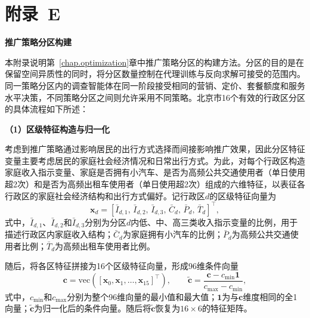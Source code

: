 
\setlength{\baselineskip}{16pt}
\chapter{附录~E}\label{appen.e}

\renewcommand{\thetable}{E-\arabic{table}}
\renewcommand{\thefigure}{E-\arabic{figure}}
\renewcommand{\theequation}{E-\arabic{equation}}
\renewcommand{\theHtable}{E.\arabic{table}}
\renewcommand{\theHfigure}{E.\arabic{figure}}
\renewcommand{\theHequation}{E.\arabic{equation}}
\setcounter{table}{0}
\setcounter{figure}{0}
\setcounter{equation}{0}

\begin{center}
\textbf{推广策略分区构建}
\end{center}

本附录说明第~\ref{chap.optimization}章中推广策略分区的构建方法。分区的目的是在保留空间异质性的同时，将分区数量控制在代理训练与反向求解可接受的范围内。同一策略分区内的调查智能体在同一阶段接受相同的营销、定价、套餐额度和服务水平决策，不同策略分区之间则允许采用不同策略。北京市16个有效的行政区分区的具体流程如下所述：

\textbf{（1）区级特征构造与归一化}

考虑到推广策略通过影响居民的出行方式选择而间接影响推广效果，因此分区特征变量主要考虑居民的家庭社会经济情况和日常出行方式。为此，对每个行政区构造家庭收入指示变量、家庭是否拥有小汽车、是否为高频公共交通使用者（单日使用超2次）和是否为高频出租车使用者（单日使用超2次）组成的六维特征，以表征各行政区的家庭社会经济结构和出行方式偏好。记行政区$d$的区级特征向量为
\begin{equation}
\bm{x}_{d}
=
\left[
\bar I_{d,1},\,
\bar I_{d,2},\,
\bar I_{d,3},\,
\bar C_{d},\,
\bar P_{d},\,
\bar T_{d}
\right]^{\top},
\label{eq.append.zone.feature}
\end{equation}
式中，$\bar I_{d,1}$、$\bar I_{d,2}$和$\bar I_{d,3}$分别为分区$d$内低、中、高三类收入指示变量的比例，用于描述行政区内家庭收入结构；$\bar C_d$为家庭拥有小汽车的比例；$\bar P_d$为高频公共交通使用者比例；$\bar T_d$为高频出租车使用者比例。

随后，将各区特征拼接为16个区级特征向量，形成96维条件向量
\begin{equation}
\bm{c}
=\mathrm{vec}
\left(
[\bm{x}_{0},\bm{x}_{1},\ldots,\bm{x}_{15}]^{\top}
\right),
\qquad
\tilde{\bm{c}}
=
\frac{\bm{c}-c_{\min}\bm{1}}
{c_{\max}-c_{\min}},
\label{eq.append.zone.scale}
\end{equation}
式中，$c_{\min}$和$c_{\max}$分别为整个96维向量的最小值和最大值；$\bm{1}$为与$\bm c$维度相同的全1向量；$\tilde{\bm c}$为归一化后的条件向量。随后将$\tilde{\bm c}$恢复为$16\times6$的特征矩阵。

